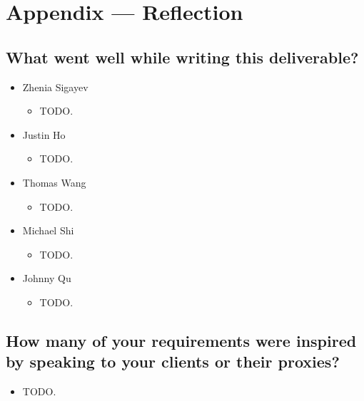 \documentclass[12pt]{article}
\begin{document}
\section*{Appendix --- Reflection}

  \subsection{What went well while writing this deliverable?}
   \begin{itemize}
    \item Zhenia Sigayev
      \begin{itemize}[label=$\circ$]
        \item TODO.
      \end{itemize}
    \item Justin Ho
      \begin{itemize}[label=$\circ$]
        \item TODO.
      \end{itemize}
    \item Thomas Wang
      \begin{itemize}[label=$\circ$]
        \item TODO.
      \end{itemize}
    \item Michael Shi
      \begin{itemize}[label=$\circ$]
        \item TODO.
      \end{itemize}
    \item Johnny Qu
      \begin{itemize}[label=$\circ$]
        \item TODO.
      \end{itemize}
  \end{itemize}

  \subsection{How many of your requirements were inspired by speaking to your clients or their proxies?}
    \begin{itemize}
      \item TODO.
    \end{itemize}
\end{document}
